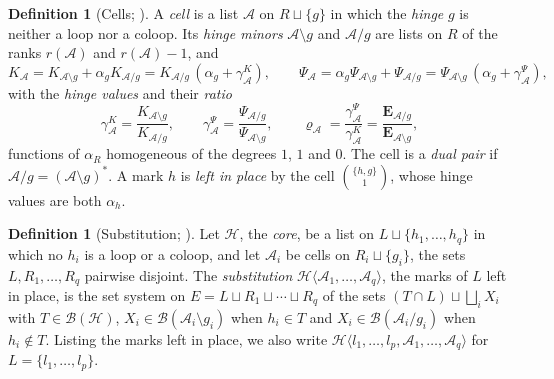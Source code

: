 \documentclass[11pt]{article}
\theoremstyle{plain}
\theoremstyle{definition}
\newtheorem{defn}[prop]{Definition}
\theoremstyle{remark}
\newcommand{\cB}{\mathcal B}
\begin{document}
\begin{defn}[Cells; {\cite[Def.~20.1, p.~163]{F}}]\label{def:cell}
A \emph{cell} is a list $\mathcal A$ on $R\sqcup\{g\}$ in which the \emph{hinge} $g$ is neither a loop nor a coloop. Its \emph{hinge minors} $\mathcal A\setminus g$ and $\mathcal A/g$ are lists on $R$ of the ranks $r(\mathcal A)$ and $r(\mathcal A)-1$, and
\[
K_{\mathcal A}=K_{\mathcal A\setminus g}+\alpha_gK_{\mathcal A/g}=K_{\mathcal A/g}\,(\alpha_g+\gamma^K_{\mathcal A}),\qquad \Psi_{\mathcal A}=\alpha_g\Psi_{\mathcal A\setminus g}+\Psi_{\mathcal A/g}=\Psi_{\mathcal A\setminus g}\,(\alpha_g+\gamma^\Psi_{\mathcal A}),
\]
with the \emph{hinge values} and their \emph{ratio}
\[
\gamma^K_{\mathcal A}=\frac{K_{\mathcal A\setminus g}}{K_{\mathcal A/g}},\qquad \gamma^\Psi_{\mathcal A}=\frac{\Psi_{\mathcal A/g}}{\Psi_{\mathcal A\setminus g}},\qquad \varrho_{\mathcal A}=\frac{\gamma^\Psi_{\mathcal A}}{\gamma^K_{\mathcal A}}=\frac{\mathbf E_{\mathcal A/g}}{\mathbf E_{\mathcal A\setminus g}},
\]
functions of $\alpha_R$ homogeneous of the degrees $1$, $1$ and $0$. The cell is a \emph{dual pair} if $\mathcal A/g=(\mathcal A\setminus g)^\ast$. A mark $h$ is \emph{left in place} by the cell $\binom{\{h,g\}}1$, whose hinge values are both $\alpha_h$.
\end{defn}

\begin{defn}[Substitution; {\cite[Def.~20.1, p.~163]{F}}]\label{def:substitution}
Let $\mathcal H$, the \emph{core}, be a list on $L\sqcup\{h_1,\dots,h_q\}$ in which no $h_i$ is a loop or a coloop, and let $\mathcal A_i$ be cells on $R_i\sqcup\{g_i\}$, the sets $L,R_1,\dots,R_q$ pairwise disjoint. The \emph{substitution} $\mathcal H\langle\mathcal A_1,\dots,\mathcal A_q\rangle$, the marks of $L$ left in place, is the set system on $E=L\sqcup R_1\sqcup\cdots\sqcup R_q$ of the sets $(T\cap L)\sqcup\bigsqcup_iX_i$ with $T\in\cB(\mathcal H)$, $X_i\in\cB(\mathcal A_i\setminus g_i)$ when $h_i\in T$ and $X_i\in\cB(\mathcal A_i/g_i)$ when $h_i\notin T$. Listing the marks left in place, we also write $\mathcal H\langle l_1,\dots,l_p,\mathcal A_1,\dots,\mathcal A_q\rangle$ for $L=\{l_1,\dots,l_p\}$.
\end{defn}
\end{document}
